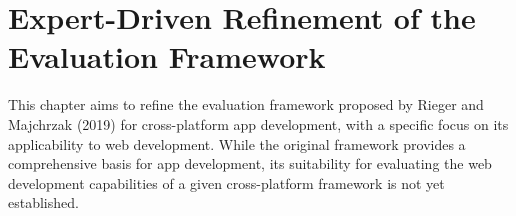 \chapter{Expert-Driven Refinement of the Evaluation Framework}

This chapter aims to refine the evaluation framework proposed by Rieger and Majchrzak (2019) for cross-platform app development, with a specific focus on its applicability to web development. While the original framework provides a comprehensive basis for app development, its suitability for evaluating the web development capabilities of a given cross-platform framework is not yet established.

